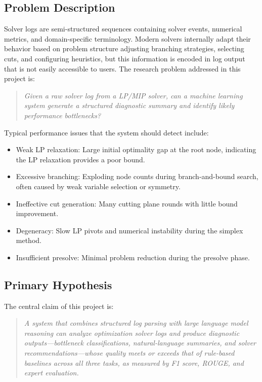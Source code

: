 \documentclass[11pt]{article}
\begin{document}
\subsection{Problem Description}

Solver logs are semi-structured sequences containing solver events, numerical metrics, and domain-specific terminology. Modern solvers internally adapt their behavior based on problem structure 
adjusting branching strategies, selecting cuts, and configuring heuristics, but this information is encoded in log output that is not easily accessible to users. 
The research problem addressed in this project is:

\begin{quote}
\emph{Given a raw solver log from a LP/MIP solver, can a machine learning system generate a structured diagnostic summary and identify likely performance bottlenecks?}
\end{quote}

Typical performance issues that the system should detect include:

\begin{itemize}
    \item Weak LP relaxation: Large initial optimality gap at the root node, indicating the LP relaxation provides a poor bound.
    \item Excessive branching: Exploding node counts during branch-and-bound search, often caused by weak variable selection or symmetry.
    \item Ineffective cut generation: Many cutting plane rounds with little bound improvement.
    \item Degeneracy: Slow LP pivots and numerical instability during the simplex method.
    \item Insufficient presolve: Minimal problem reduction during the presolve phase.
\end{itemize}

\subsection{Primary Hypothesis}

The central claim of this project is:

\begin{quote}
\emph{A system that combines structured log parsing with large language model reasoning can analyze optimization solver logs and produce diagnostic outputs---bottleneck classifications, natural-language summaries, and solver recommendations---whose quality meets or exceeds that of rule-based baselines across all three tasks, as measured by F1 score, ROUGE, and expert evaluation.}
\end{quote}
\end{document}
